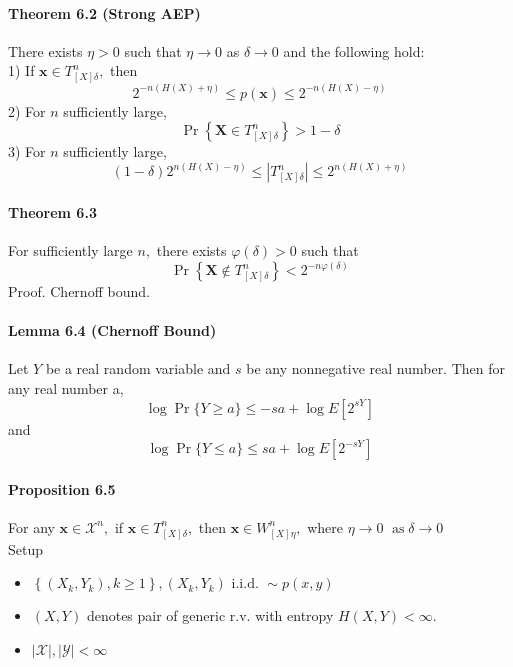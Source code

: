 \documentclass[8pt]{article}
\begin{document}
\paragraph{Theorem 6.2 (Strong AEP)} There exists $\eta>0$ such that $\eta \rightarrow 0$ as $\delta \rightarrow 0$ and the following hold: \\
1) If $\mathbf{x} \in T_{[X] \delta}^{n},$ then
$$
2^{-n(H(X)+\eta)} \leq p(\mathbf{x}) \leq 2^{-n(H(X)-\eta)}
$$
2) For $n$ sufficiently large,
$$
\operatorname{Pr}\left\{\mathbf{X} \in T_{[X] \delta}^{n}\right\}>1-\delta
$$
3) For $n$ sufficiently large,
$$
(1-\delta) 2^{n(H(X)-\eta)} \leq\left|T_{[X] \delta}^{n}\right| \leq 2^{n(H(X)+\eta)}
$$

\paragraph{Theorem 6.3} For sufficiently large $n,$ there exists $\varphi(\delta)>0$ such that
$$
\operatorname{Pr}\left\{\mathbf{X} \notin T_{[X] \delta}^{n}\right\}<2^{-n \varphi(\delta)}
$$
Proof. Chernoff bound.

\paragraph{Lemma 6.4 (Chernoff Bound)} Let $Y$ be a real random variable and $s$ be any nonnegative real number. Then for any real number a,
$$
\log \operatorname{Pr}\{Y \geq a\} \leq-s a+\log E\left[2^{s Y}\right]
$$
and
$$
\log \operatorname{Pr}\{Y \leq a\} \leq s a+\log E\left[2^{-s Y}\right]
$$

\paragraph{Proposition 6.5} For any $\mathbf{x} \in \mathcal{X}^{n},$ if $\mathbf{x} \in T_{[X] \delta}^{n},$ then $\mathbf{x} \in W_{[X] \eta}^{n},$ where $\eta \rightarrow 0$
$\operatorname{as} \delta \rightarrow 0$\\

\noindent Setup
\begin{itemize}
	\item $\left\{\left(X_{k}, Y_{k}\right), k \geq 1\right\},\left(X_{k}, Y_{k}\right) \text { i.i.d. } \sim p(x, y)$
	\item $(X, Y)$ denotes pair of generic $\mathrm{r} . \mathrm{v}$. with entropy $H(X, Y)<\infty$.
	\item $|\mathcal{X}|,|\mathcal{Y}|<\infty$
\end{itemize}
\end{document}
